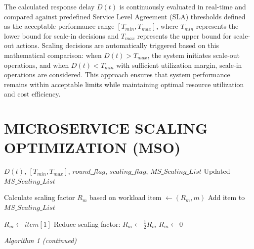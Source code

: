 The calculated response delay $D(t)$ is continuously evaluated in real-time and compared against predefined Service Level Agreement (SLA) thresholds defined as the acceptable performance range $[T_{min}, T_{max}]$, where $T_{min}$ represents the lower bound for scale-in decisions and $T_{max}$ represents the upper bound for scale-out actions. Scaling decisions are automatically triggered based on this mathematical comparison: when $D(t) > T_{max}$, the system initiates scale-out operations, and when $D(t) < T_{min}$ with sufficient utilization margin, scale-in operations are considered. This approach ensures that system performance remains within acceptable limits while maintaining optimal resource utilization and cost efficiency.

\section{MICROSERVICE SCALING OPTIMIZATION (MSO)}

\begin{algorithm}[H]
\caption{MSO (Part 1)}
\begin{algorithmic}[1]

\Require $D(t)$, $[T_{min},T_{max}]$, $round\_flag$, $scaling\_flag$, $MS\_Scaling\_List$
\Ensure Updated $MS\_Scaling\_List$

        \State Calculate scaling factor $R_m$ based on workload
        \State item $\leftarrow (R_m, m)$
        \State Add item to $MS\_Scaling\_List$
    \EndFor
\Else

        \State $R_m \leftarrow item[1]$
            \State Reduce scaling factor: $R_m \leftarrow \frac{1}{2} R_m$
        \Else
            \State $R_m \leftarrow 0$
        \EndIf
    \EndFor
\EndIf

\end{algorithmic}
\end{algorithm}

\noindent \textit{Algorithm 1 (continued)}

